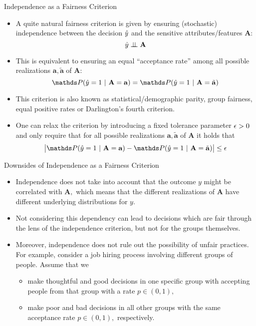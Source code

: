 \documentclass[11pt,compress,t,notes=noshow, xcolor=table]{beamer}
\newcommand{\sens}{\mathbf{A}} %
\newcommand{\ba}{\mathbf{a}}
\newcommand{\batilde}{\tilde{\mathbf{a}}}
\begin{document}
\begin{vbframe}{Independence as a Fairness Criterion}
	\small{
		\begin{itemize}
			\item A quite natural fairness criterion is given by ensuring (stochastic) independence between the decision $\hat{y}$ and the sensitive attributes/features $\sens:$
%			
			$$	\yh \indep \sens	$$
%			
			\item This is equivalent to ensuring an equal ``acceptance rate'' among all possible realizations $\ba,\batilde$ of $\sens:$
%			
			$$  \P(  \yh = 1 ~|~ \sens = \ba ) = \P(  \yh = 1 ~|~ \sens = \batilde )$$
			\item This criterion is also known as statistical/demographic parity, group fairness, equal positive rates or Darlington's fourth criterion.
%			
			\item One can relax the criterion by introducing a fixed tolerance parameter $\epsilon>0$ and only require that for all possible realizations $\ba,\batilde$ of $\sens$ it holds that
%			
			$$  \big|  \P(  \yh = 1 ~|~ \sens = \ba ) - \P(  \yh = 1 ~|~ \sens = \batilde ) \big| \leq \eps $$
%		
		\end{itemize}
%	
	}
\end{vbframe}


\begin{vbframe}{Downsides of Independence as a Fairness Criterion}
	\small{
		\begin{itemize}
			\item Independence does not take into account that the outcome $y$ might be correlated with $\sens,$ which means that the different realizations of $\sens$ have different underlying distributions for $y.$
			\item Not considering this dependency can lead to decisions which are fair through the lens of the independence criterion, but not for the groups themselves. 
%			
			\item Moreover, independence does not rule out the possibility of unfair practices. For example, consider a job hiring process involving different groups of people. Assume that we 
%			
			\begin{itemize}
				\small
%				
				\item make thoughtful and good decisions in one specific group with accepting people from that group with a rate $p\in(0,1),$
%				
				\item make poor and bad decisions in all other groups with the same acceptance rate $p\in(0,1),$ respectively.
%							
			\end{itemize}	
%		
		\end{itemize}
	}
\end{vbframe}
\end{document}
